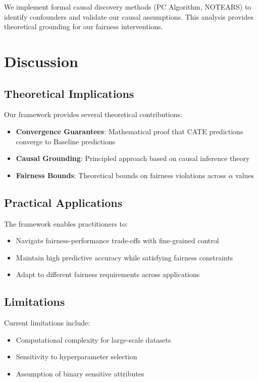 \documentclass{article} %
\begin{document}
We implement formal causal discovery methods (PC Algorithm, NOTEARS) to identify confounders and validate our causal assumptions. This analysis provides theoretical grounding for our fairness interventions.

\section{Discussion}

\subsection{Theoretical Implications}

Our framework provides several theoretical contributions:
\begin{itemize}
\item \textbf{Convergence Guarantees}: Mathematical proof that CATE predictions converge to Baseline predictions
\item \textbf{Causal Grounding}: Principled approach based on causal inference theory
\item \textbf{Fairness Bounds}: Theoretical bounds on fairness violations across $\alpha$ values
\end{itemize}

\subsection{Practical Applications}

The framework enables practitioners to:
\begin{itemize}
\item Navigate fairness-performance trade-offs with fine-grained control
\item Maintain high predictive accuracy while satisfying fairness constraints
\item Adapt to different fairness requirements across applications
\end{itemize}

\subsection{Limitations}

Current limitations include:
\begin{itemize}
\item Computational complexity for large-scale datasets
\item Sensitivity to hyperparameter selection
\item Assumption of binary sensitive attributes
\end{itemize}
\end{document}
